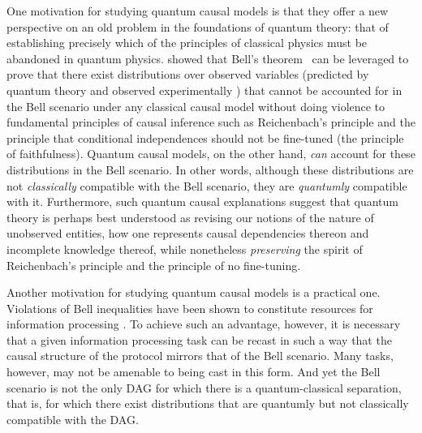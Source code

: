 
One motivation for studying quantum causal models is that they offer a new perspective on an old  problem in the foundations of quantum theory: that of establishing precisely which of the principles of classical physics must be abandoned in quantum physics. \citet{WoodSpekkens} showed that Bell's theorem~\cite{bell1966lhvm} can be leveraged to prove that there exist distributions over observed variables (predicted by quantum theory and observed experimentally \cite{Brunner2013Bell}) that cannot be accounted for in the Bell scenario under any classical causal model without doing violence to fundamental principles of causal inference such as Reichenbach's principle and the principle that conditional independences should not be fine-tuned (the principle of faithfulness). 
Quantum causal models, on the other hand, {\em can} account for these distributions in the Bell scenario.  In other words, although these distributions are not {\em classically} compatible with the Bell scenario, they are {\em quantumly} compatible with it.  Furthermore, such quantum causal explanations suggest \cite{leifer2013conditionalstates,Spekkens2015paradigm,henson2011ontic} that quantum theory is perhaps best understood as revising our notions of the nature of unobserved entities, how one represents causal dependencies thereon and incomplete knowledge thereof, while 
nonetheless {\em preserving} the spirit of Reichenbach's principle and the principle of no fine-tuning. 

Another motivation for studying quantum causal models is a practical one.  Violations of Bell inequalities have  been shown to constitute resources for information processing \cite{NoSigPolytope,scarani2012device,BancalDIApproach}.   To achieve such an advantage, however, it is necessary that a given information processing task can be recast in such a way that the causal structure of the protocol mirrors that of the Bell scenario.  Many tasks, however, may not be amenable to being cast in this form.  And yet the Bell scenario is not the only DAG for which there is a quantum-classical separation, that is, for which there exist distributions that are quantumly but not classically compatible with the DAG. 
 
